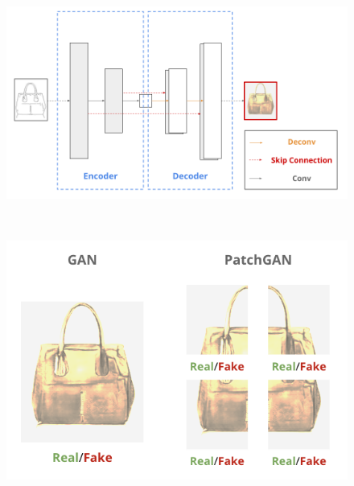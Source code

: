 \begin{figure}[b]
\centering
\begin{minipage}[b]{0.52\columnwidth}
\centering
\includegraphics[width=\columnwidth]{figure/u-net.png}
\label{fig:u-net}
\end{minipage}\\
\begin{minipage}[b]{0.52\columnwidth}
\centering
\includegraphics[width=\columnwidth]{figure/patchgan.png}
\label{fig:patchgan}
\end{minipage}
\caption[Pix2pixの生成モデルと識別モデル]{}
\end{figure}